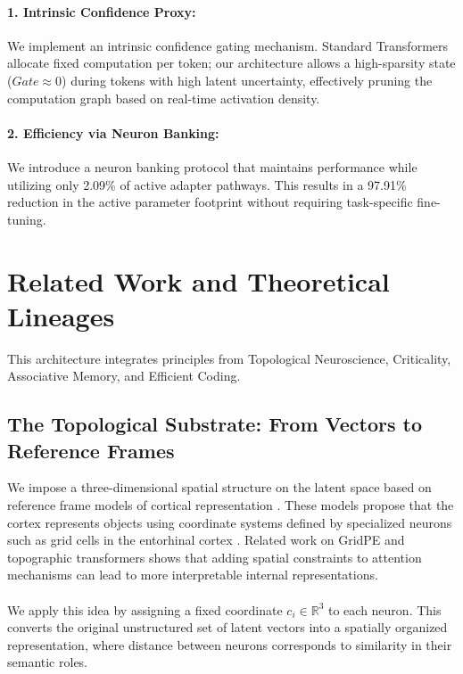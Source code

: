 \documentclass[11pt, letterpaper]{article}
\begin{document}
\paragraph{1. Intrinsic Confidence Proxy:} We implement an intrinsic confidence gating mechanism. Standard Transformers allocate fixed computation per token; our architecture allows a high-sparsity state ($Gate \approx 0$) during tokens with high latent uncertainty, effectively pruning the computation graph based on real-time activation density.

\paragraph{2. Efficiency via Neuron Banking:} We introduce a neuron banking protocol that maintains performance while utilizing only 
2.09\% of active adapter pathways. This results in a 97.91\% reduction in the active parameter footprint without requiring task-specific fine-tuning.

\section{Related Work and Theoretical Lineages} This architecture integrates principles from Topological Neuroscience, Criticality, Associative Memory, and Efficient Coding.

\subsection{The Topological Substrate: From Vectors to Reference Frames}
We impose a three-dimensional spatial structure on the latent space based on reference frame models of cortical representation \cite{hawkins_2019, hawkins_2021}. These models propose that the cortex represents objects using coordinate systems defined by specialized neurons such as grid cells in the entorhinal cortex \cite{neocortex_grid}. Related work on GridPE \cite{gridpe} and topographic transformers \cite{topoformer} shows that adding spatial constraints to attention mechanisms can lead to more interpretable internal representations.

\paragraph{}
We apply this idea by assigning a fixed coordinate $c_i \in \mathbb{R}^3$ to each neuron. This converts the original unstructured set of latent vectors into a spatially organized representation, where distance between neurons corresponds to similarity in their semantic roles.
\end{document}
